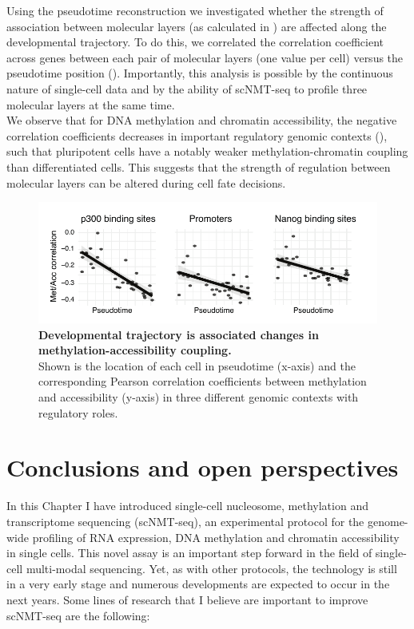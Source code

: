 Using the pseudotime reconstruction we investigated whether the strength of association between molecular layers (as calculated in ) are affected along the developmental trajectory. To do this, we correlated the correlation coefficient across genes between each pair of molecular layers (one value per cell) versus the pseudotime position (). Importantly, this analysis is possible by the continuous nature of single-cell data and by the ability of scNMT-seq to profile three molecular layers at the same time.\\
We observe that for DNA methylation and chromatin accessibility, the negative correlation coefficients decreases in important regulatory genomic contexts (), such that pluripotent cells have a notably weaker methylation-chromatin coupling than differentiated cells. This suggests that the strength of regulation between molecular layers can be altered during cell fate decisions.

\begin{figure}[H]
	\centering
	\includegraphics[width=0.9\linewidth]{scNMT_pseudotime_coupling}
	\caption[]{\textbf{Developmental trajectory is associated changes in methylation-accessibility coupling.}\\
	Shown is the location of each cell in pseudotime (x-axis) and the corresponding Pearson correlation coefficients between methylation and accessibility (y-axis) in three different genomic contexts with regulatory roles.
	}
	\label{fig:scnmt_pseudotime_coupling}
\end{figure}

\section{Conclusions and open perspectives}

In this Chapter I have introduced single-cell nucleosome, methylation and transcriptome sequencing (scNMT-seq), an experimental protocol for the genome-wide profiling of RNA expression, DNA methylation and chromatin accessibility in single cells. This novel assay is an important step forward in the field of single-cell multi-modal sequencing. Yet, as with other protocols, the technology is still in a very early stage and numerous developments are expected to occur in the next years. Some lines of research that I believe are important to improve scNMT-seq are the following:

